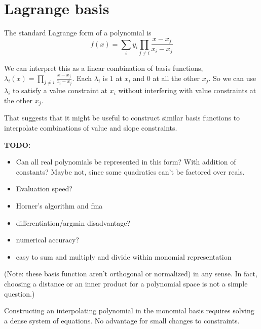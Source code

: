 % 

%

% 
% 

\restoregeometry
  
\section{Lagrange basis}\label{sec:Lagrange-basis}

The standard Lagrange\cite{wiki:Lagrange-polynomial}
form of a polynomial  is
\begin{equation}
f(x) = \sum_{i} y_i \prod_{j \neq i} \frac{x - x_j}{x_i -x_j}
\end{equation}

We can interpret this as a linear combination of basis functions,
$\lambda_i (x) = \prod_{j \neq i} \frac{x - x_j}{x_i -x_j}$.
Each $\lambda_i$ is $1$ at $x_i$ and $0$ at all the other $x_j$.
So we can use $\lambda_i$ to satisfy a value constraint at $x_i$
without interfering with value constraints at the other $x_j$.

That suggests that it might be useful to construct similar basis
functions to interpolate combinations of value and slope 
constraints.

\textbf{TODO:} 
\begin{itemize}
  \item Can all real polynomials be represented in this form? 
        With addition of constants? Maybe not, since some
        quadratics can't be factored over reals.
  \item Evaluation speed?
  \item Horner's algorithm and fma
  \item differentiation/argmin disadvantage?
  \item numerical accuracy?
  \item easy to sum and multiply and divide within monomial
  representation
\end{itemize}

(Note: these basis function aren't orthogonal or normalized)
in any
sense. In fact, choosing a distance or an inner product for
a polynomial space is not a simple question.)

Constructing an interpolating polynomial in the monomial basis
requires solving a dense system of equations. 
No advantage for small changes to constraints.


